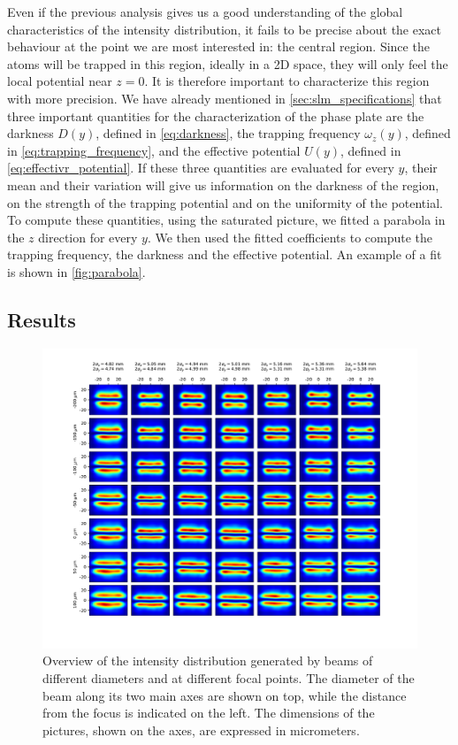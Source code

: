 Even if the previous analysis gives us a good understanding of the global characteristics of the intensity distribution, it fails to be precise about the exact behaviour at the point we are most interested in: the central region. Since the atoms will be trapped in this region, ideally in a 2D space, they will only feel the local potential near $z=0$. It is therefore important to characterize this region with more precision.
We have already mentioned in \cref{sec:slm_specifications} that three important quantities for the characterization of the phase plate are the darkness $D(y)$, defined in \cref{eq:darkness}, the trapping frequency $\omega_z(y)$, defined in \cref{eq:trapping_frequency}, and the effective potential $U(y)$, defined in \cref{eq:effectivr_potential}. If these three quantities are evaluated for every $y$, their mean and their variation will give us information on the darkness of the region, on the strength of the trapping potential and on the uniformity of the potential.
To compute these quantities, using the saturated picture, we fitted a parabola in the $z$ direction for every $y$. We then used the fitted coefficients to compute the trapping frequency, the darkness and the effective potential. An example of a fit is shown in \cref{fig:parabola}.

\subsection{Results}

\begin{figure}
    \centering
    \includegraphics[width=1.3\textwidth, center]{chapters/chapter_3/figures/grid.pdf}
    \caption{Overview of the intensity distribution generated by beams of different diameters and at different focal points. The diameter of the beam along its two main axes are shown on top, while the distance from the focus is indicated on the left. The dimensions of the pictures, shown on the axes, are expressed in micrometers.}
    \label{fig:grid}
\end{figure}

